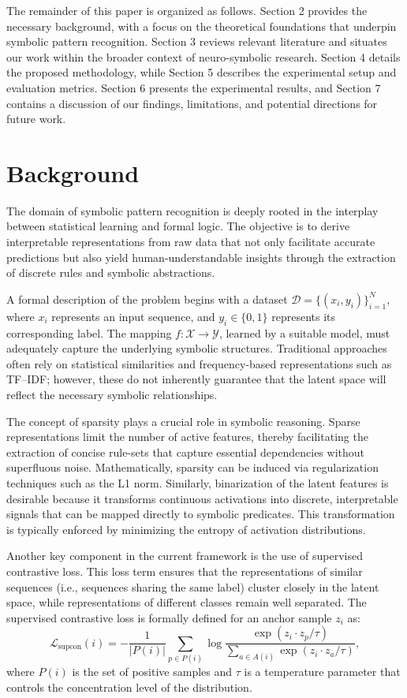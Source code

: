 \documentclass{article}
\begin{document}
The remainder of this paper is organized as follows. Section 2 provides the necessary background, with a focus on the theoretical foundations that underpin symbolic pattern recognition. Section 3 reviews relevant literature and situates our work within the broader context of neuro-symbolic research. Section 4 details the proposed methodology, while Section 5 describes the experimental setup and evaluation metrics. Section 6 presents the experimental results, and Section 7 contains a discussion of our findings, limitations, and potential directions for future work.

\section{Background}
The domain of symbolic pattern recognition is deeply rooted in the interplay between statistical learning and formal logic. The objective is to derive interpretable representations from raw data that not only facilitate accurate predictions but also yield human-understandable insights through the extraction of discrete rules and symbolic abstractions.

A formal description of the problem begins with a dataset \(\mathcal{D} = \{(x_i, y_i)\}_{i=1}^N\), where \(x_i\) represents an input sequence, and \(y_i \in \{0,1\}\) represents its corresponding label. The mapping \(f: \mathcal{X} \to \mathcal{Y}\), learned by a suitable model, must adequately capture the underlying symbolic structures. Traditional approaches often rely on statistical similarities and frequency-based representations such as TF–IDF; however, these do not inherently guarantee that the latent space will reflect the necessary symbolic relationships.

The concept of sparsity plays a crucial role in symbolic reasoning. Sparse representations limit the number of active features, thereby facilitating the extraction of concise rule-sets that capture essential dependencies without superfluous noise. Mathematically, sparsity can be induced via regularization techniques such as the L1 norm. Similarly, binarization of the latent features is desirable because it transforms continuous activations into discrete, interpretable signals that can be mapped directly to symbolic predicates. This transformation is typically enforced by minimizing the entropy of activation distributions.

Another key component in the current framework is the use of supervised contrastive loss. This loss term ensures that the representations of similar sequences (i.e., sequences sharing the same label) cluster closely in the latent space, while representations of different classes remain well separated. The supervised contrastive loss is formally defined for an anchor sample \(z_i\) as:
\[
\mathcal{L}_{\text{supcon}}(i) = - \frac{1}{|P(i)|} \sum_{p \in P(i)} \log \frac{\exp(z_i \cdot z_p/\tau)}{\sum_{a \in A(i)} \exp(z_i \cdot z_a/\tau)},
\]
where \(P(i)\) is the set of positive samples and \(\tau\) is a temperature parameter that controls the concentration level of the distribution.
\end{document}
